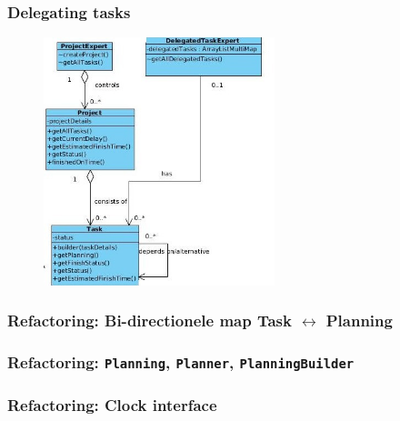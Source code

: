 \documentclass{beamer}
\begin{document}
\begin{frame}
\frametitle {Delegating tasks}
\begin{figure}
\centering
\begin{center}
\includegraphics[width=0.6\textwidth]{figures/Class_diagram_DelegateTask.jpg}
\end{center}

\end{figure}

\end{frame}


\begin{frame}
\frametitle {Refactoring: Bi-directionele map Task $\leftrightarrow$ Planning}


\end{frame}


\begin{frame}
\frametitle {Refactoring: \texttt{Planning}, \texttt{Planner}, \texttt{PlanningBuilder}}



\end{frame}

\begin{frame}
\frametitle {Refactoring: Clock interface}



\end{frame}





%
\end{document}
